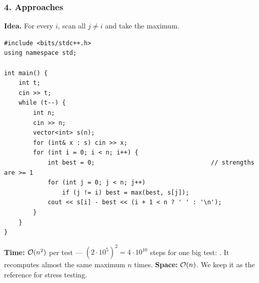 \begin{diagrambox}
\end{diagrambox}

\subsubsection*{4. Approaches}

\begin{bruteforcebox}
\textbf{Idea.} For every $i$, scan all $j \ne i$ and take the maximum.
\begin{lstlisting}[style=cpp]
#include <bits/stdc++.h>
using namespace std;

int main() {
    int t;
    cin >> t;
    while (t--) {
        int n;
        cin >> n;
        vector<int> s(n);
        for (int& x : s) cin >> x;
        for (int i = 0; i < n; i++) {
            int best = 0;                                // strengths are >= 1
            for (int j = 0; j < n; j++)
                if (j != i) best = max(best, s[j]);
            cout << s[i] - best << (i + 1 < n ? ' ' : '\n');
        }
    }
}
\end{lstlisting}
\begin{complexitybox}
\textbf{Time:} $\mathcal{O}(n^2)$ per test --- $(2\cdot10^5)^2 = 4\cdot10^{10}$ steps for one big test: \tle{}. It recomputes almost the same maximum $n$ times. \textbf{Space:} $\mathcal{O}(n)$. We keep it as the reference for stress testing.
\end{complexitybox}
\end{bruteforcebox}

